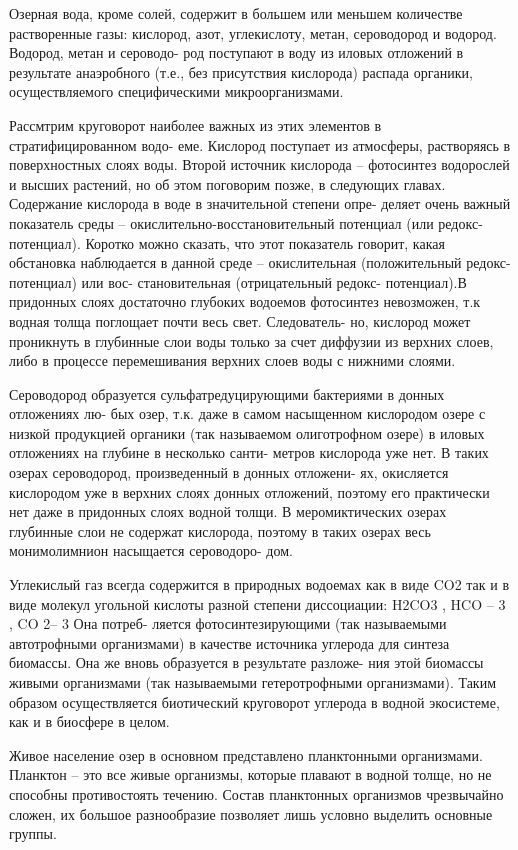 Озерная вода, кроме солей, содержит в большем или меньшем количестве растворенные
газы: кислород, азот, углекислоту, метан, сероводород и водород. Водород, метан и сероводо-
род поступают в воду из иловых отложений в результате анаэробного (т.е., без присутствия
кислорода) распада органики, осуществляемого специфическими микроорганизмами.

Рассмтрим круговорот наиболее важных из этих элементов в стратифицированном водо-
еме. Кислород поступает из атмосферы, растворяясь в поверхностных слоях воды. Второй
источник кислорода – фотосинтез водорослей и высших растений, но об этом поговорим
позже, в следующих главах. Содержание кислорода в воде в значительной степени опре-
деляет очень важный показатель среды – окислительно-восстановительный потенциал (или
редокс-потенциал). Коротко можно сказать, что этот показатель говорит, какая обстановка
наблюдается в данной среде – окислительная (положительный редокс-потенциал) или вос-
становительная (отрицательный редокс- потенциал).В придонных слоях достаточно глубоких
водоемов фотосинтез невозможен, т.к водная толща поглощает почти весь свет. Следователь-
но, кислород может проникнуть в глубинные слои воды только за счет диффузии из верхних
слоев, либо в процессе перемешивания верхних слоев воды с нижними слоями.

Сероводород образуется сульфатредуцирующими бактериями в донных отложениях лю-
бых озер, т.к. даже в самом насыщенном кислородом озере с низкой продукцией органики
(так называемом олиготрофном озере) в иловых отложениях на глубине в несколько санти-
метров кислорода уже нет. В таких озерах сероводород, произведенный в донных отложени-
ях, окисляется кислородом уже в верхних слоях донных отложений, поэтому его практически
нет даже в придонных слоях водной толщи. В меромиктических озерах глубинные слои не
содержат кислорода, поэтому в таких озерах весь монимолимнион насыщается сероводоро-
дом.

Углекислый газ всегда содержится в природных водоемах как в виде CO2
так и в виде
молекул угольной кислоты разной степени диссоциации: H2CO3
, HCO –
3
, CO 2–
3 Она потреб-
ляется фотосинтезирующими (так называемыми автотрофными организмами) в качестве
источника углерода для синтеза биомассы. Она же вновь образуется в результате разложе-
ния этой биомассы живыми организмами (так называемыми гетеротрофными организмами).
Таким образом осуществляется биотический круговорот углерода в водной экосистеме, как
и в биосфере в целом.

Живое население озер в основном представлено планктонными организмами. Планктон –
это все живые организмы, которые плавают в водной толще, но не способны противостоять
течению. Состав планктонных организмов чрезвычайно сложен, их большое разнообразие
позволяет лишь условно выделить основные группы.

